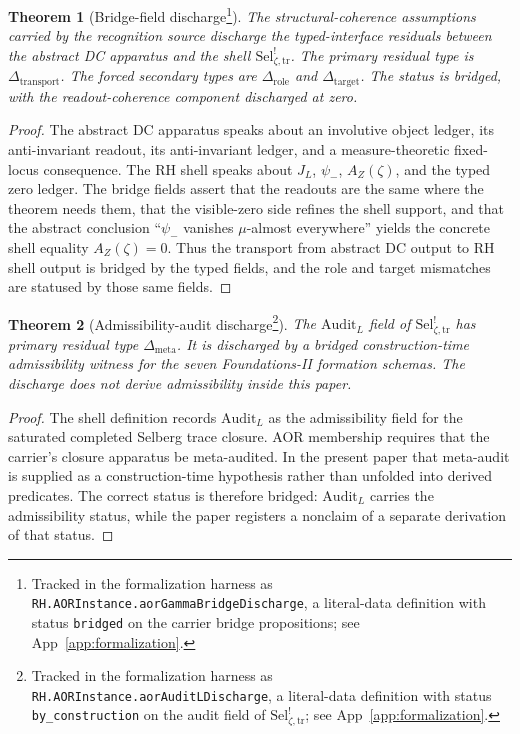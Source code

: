 \documentclass[11pt]{article}
\newcommand{\JL}{J_{L}}
\newcommand{\psimRH}{\psi_{-}}
\newcommand{\AZ}{A_{Z}(\zeta)}
\newcommand{\Sel}{\mathrm{Sel}^{!}_{\zeta,\mathrm{tr}}}
\newcommand{\psim}{\psi_{-}}
\newtheorem{theorem}{Theorem}[section]
\theoremstyle{definition}
\begin{document}
\begin{theorem}[Bridge-field discharge\footnote{Tracked in the formalization harness as \nolinkurl{RH.AORInstance.aorGammaBridgeDischarge}, a literal-data definition with status \texttt{bridged} on the carrier bridge propositions; see App~\ref{app:formalization}.}]
\label{thm:rh:aor-gamma-bridge-discharge}
The structural-coherence assumptions carried by the recognition source
discharge the typed-interface residuals between the abstract DC
apparatus and the shell \(\Sel\).  The primary residual type is
\(\Delta_{\mathrm{transport}}\).  The forced secondary types are
\(\Delta_{\mathrm{role}}\) and \(\Delta_{\mathrm{target}}\).  The
status is bridged, with the readout-coherence component discharged at
zero.
\end{theorem}

\begin{proof}
The abstract DC apparatus speaks about an involutive object ledger,
its anti-invariant readout, its anti-invariant ledger, and a
measure-theoretic fixed-locus consequence.  The RH shell speaks about
\(\JL\), \(\psimRH\), \(\AZ\), and the typed zero ledger.  The bridge
fields assert that the readouts are the same where the theorem needs
them, that the visible-zero side refines the shell support, and that
the abstract conclusion ``\(\psim\) vanishes \(\mu\)-almost
everywhere'' yields the concrete shell equality \(\AZ=0\).  Thus the
transport from abstract DC output to RH shell output is bridged by the
typed fields, and the role and target mismatches are statused by those
same fields.
\end{proof}

\begin{theorem}[Admissibility-audit discharge\footnote{Tracked in the formalization harness as \nolinkurl{RH.AORInstance.aorAuditLDischarge}, a literal-data definition with status \texttt{by\_construction} on the audit field of \(\Sel\); see App~\ref{app:formalization}.}]
\label{thm:rh:aor-auditL-discharge}
The \(\mathrm{Audit}_{L}\) field of \(\Sel\) has primary residual type
\(\Delta_{\mathrm{meta}}\).  It is discharged by a bridged
construction-time admissibility witness for the seven Foundations-II
formation schemas.  The discharge does not derive admissibility inside
this paper.
\end{theorem}

\begin{proof}
The shell definition records \(\mathrm{Audit}_{L}\) as the
admissibility field for the saturated completed Selberg trace closure.
AOR membership requires that the carrier's closure apparatus be
meta-audited.  In the present paper that meta-audit is supplied as a
construction-time hypothesis rather than unfolded into derived
predicates.  The correct status is therefore bridged:
\(\mathrm{Audit}_{L}\) carries the admissibility status, while the
paper registers a nonclaim of a separate derivation of that status.
\end{proof}
\end{document}
